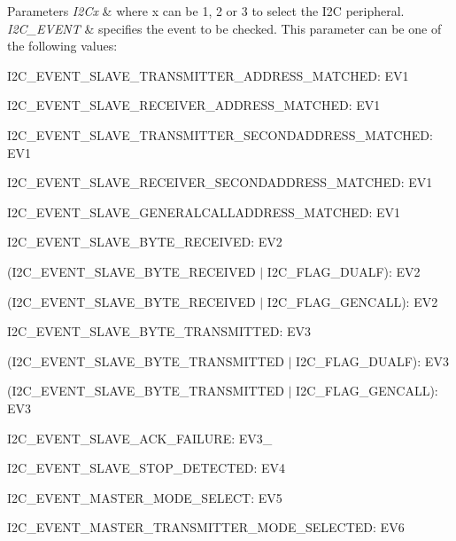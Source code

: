 \begin{DoxyParams}{Parameters}
{\em I2\+Cx} & where x can be 1, 2 or 3 to select the I2C peripheral. \\
\hline
{\em I2\+C\+\_\+\+E\+V\+E\+NT} & specifies the event to be checked. This parameter can be one of the following values\+: \begin{DoxyItemize}
\item I2\+C\+\_\+\+E\+V\+E\+N\+T\+\_\+\+S\+L\+A\+V\+E\+\_\+\+T\+R\+A\+N\+S\+M\+I\+T\+T\+E\+R\+\_\+\+A\+D\+D\+R\+E\+S\+S\+\_\+\+M\+A\+T\+C\+H\+ED\+: E\+V1 \item I2\+C\+\_\+\+E\+V\+E\+N\+T\+\_\+\+S\+L\+A\+V\+E\+\_\+\+R\+E\+C\+E\+I\+V\+E\+R\+\_\+\+A\+D\+D\+R\+E\+S\+S\+\_\+\+M\+A\+T\+C\+H\+ED\+: E\+V1 \item I2\+C\+\_\+\+E\+V\+E\+N\+T\+\_\+\+S\+L\+A\+V\+E\+\_\+\+T\+R\+A\+N\+S\+M\+I\+T\+T\+E\+R\+\_\+\+S\+E\+C\+O\+N\+D\+A\+D\+D\+R\+E\+S\+S\+\_\+\+M\+A\+T\+C\+H\+ED\+: E\+V1 \item I2\+C\+\_\+\+E\+V\+E\+N\+T\+\_\+\+S\+L\+A\+V\+E\+\_\+\+R\+E\+C\+E\+I\+V\+E\+R\+\_\+\+S\+E\+C\+O\+N\+D\+A\+D\+D\+R\+E\+S\+S\+\_\+\+M\+A\+T\+C\+H\+ED\+: E\+V1 \item I2\+C\+\_\+\+E\+V\+E\+N\+T\+\_\+\+S\+L\+A\+V\+E\+\_\+\+G\+E\+N\+E\+R\+A\+L\+C\+A\+L\+L\+A\+D\+D\+R\+E\+S\+S\+\_\+\+M\+A\+T\+C\+H\+ED\+: E\+V1 \item I2\+C\+\_\+\+E\+V\+E\+N\+T\+\_\+\+S\+L\+A\+V\+E\+\_\+\+B\+Y\+T\+E\+\_\+\+R\+E\+C\+E\+I\+V\+ED\+: E\+V2 \item (I2\+C\+\_\+\+E\+V\+E\+N\+T\+\_\+\+S\+L\+A\+V\+E\+\_\+\+B\+Y\+T\+E\+\_\+\+R\+E\+C\+E\+I\+V\+ED $\vert$ I2\+C\+\_\+\+F\+L\+A\+G\+\_\+\+D\+U\+A\+LF)\+: E\+V2 \item (I2\+C\+\_\+\+E\+V\+E\+N\+T\+\_\+\+S\+L\+A\+V\+E\+\_\+\+B\+Y\+T\+E\+\_\+\+R\+E\+C\+E\+I\+V\+ED $\vert$ I2\+C\+\_\+\+F\+L\+A\+G\+\_\+\+G\+E\+N\+C\+A\+LL)\+: E\+V2 \item I2\+C\+\_\+\+E\+V\+E\+N\+T\+\_\+\+S\+L\+A\+V\+E\+\_\+\+B\+Y\+T\+E\+\_\+\+T\+R\+A\+N\+S\+M\+I\+T\+T\+ED\+: E\+V3 \item (I2\+C\+\_\+\+E\+V\+E\+N\+T\+\_\+\+S\+L\+A\+V\+E\+\_\+\+B\+Y\+T\+E\+\_\+\+T\+R\+A\+N\+S\+M\+I\+T\+T\+ED $\vert$ I2\+C\+\_\+\+F\+L\+A\+G\+\_\+\+D\+U\+A\+LF)\+: E\+V3 \item (I2\+C\+\_\+\+E\+V\+E\+N\+T\+\_\+\+S\+L\+A\+V\+E\+\_\+\+B\+Y\+T\+E\+\_\+\+T\+R\+A\+N\+S\+M\+I\+T\+T\+ED $\vert$ I2\+C\+\_\+\+F\+L\+A\+G\+\_\+\+G\+E\+N\+C\+A\+LL)\+: E\+V3 \item I2\+C\+\_\+\+E\+V\+E\+N\+T\+\_\+\+S\+L\+A\+V\+E\+\_\+\+A\+C\+K\+\_\+\+F\+A\+I\+L\+U\+RE\+: E\+V3\+\_ \item I2\+C\+\_\+\+E\+V\+E\+N\+T\+\_\+\+S\+L\+A\+V\+E\+\_\+\+S\+T\+O\+P\+\_\+\+D\+E\+T\+E\+C\+T\+ED\+: E\+V4 \item I2\+C\+\_\+\+E\+V\+E\+N\+T\+\_\+\+M\+A\+S\+T\+E\+R\+\_\+\+M\+O\+D\+E\+\_\+\+S\+E\+L\+E\+CT\+: E\+V5 \item I2\+C\+\_\+\+E\+V\+E\+N\+T\+\_\+\+M\+A\+S\+T\+E\+R\+\_\+\+T\+R\+A\+N\+S\+M\+I\+T\+T\+E\+R\+\_\+\+M\+O\+D\+E\+\_\+\+S\+E\+L\+E\+C\+T\+ED\+: E\+V6 ~\newline

\end{DoxyItemize}
\end{DoxyParams}
